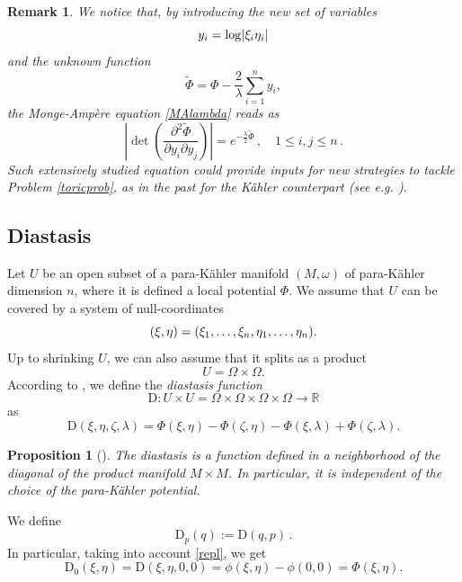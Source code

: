 \documentclass[11pt, reqno]{amsart}
\DeclarePairedDelimiter{\abs}{\lvert}{\rvert}
\newtheorem{prop}[theor]{Proposition}
\newtheorem{rem}[theor]{Remark}
\newcommand{\de}{\partial}
\newcommand{\dd}{\mathrm{D}}
\newcommand{\R}{\mathds{R}}
\newcommand{\K }{K\"{a}hler }
\newcommand{\pk }{para-K\"{a}hler }
\begin{document}
\begin{rem}
We notice that, by introducing the new set of variables
$$y_i=\log\abs{\xi_i\eta_i}$$
and the unknown function
$$\tilde \Phi=\Phi-\frac{2}{\lambda}\sum_{i=1}^n y_i,$$
 the  Monge-Ampère equation  \eqref{MAlambda} reads as 
\begin{equation*}
\left|\det\left( \frac{\de^2 \tilde\Phi}{\de y_i\de y_j}\right)\right|=
e^{-\frac{\lambda}{2}\tilde\Phi}\,,\quad 1\leq i,j\leq n\,.
\end{equation*}
Such  extensively studied equation could provide inputs for new strategies to tackle Problem \ref{toricprob}, as in the past for the \K counterpart (see e.g. \cite{bb}).
\end{rem}



\subsection{Diastasis}\label{sec.diastasis}


Let  $U$ be an open subset of a \pk manifold  $(M,\omega)$ of \pk dimension $n$,  where it is defined a local potential $\Phi$. We  assume that $U$ can be covered by a system of null-coordinates 
$$
(\xi,\eta)=(\xi_1,\mathellipsis,\xi_n,\eta_1,\mathellipsis,\eta_n).
$$
%
Up to shrinking $U$, we can also assume that it splits as a product 
$$U=\Omega\times \Omega.$$  
According to \cite{MSpK}, we define the \emph{diastasis function}
$$\dd:U\times U=\Omega\times\Omega\times\Omega\times\Omega\to\R$$
as
$$
\dd\left(\xi,\eta,\zeta,\lambda\right)=\Phi(\xi,\eta)-\Phi(\zeta,\eta)-\Phi(\xi,\lambda)+\Phi(\zeta,\lambda).
$$

\begin{prop}[\cite{MSpK}]
The diastasis is a function defined in a neighborhood of the diagonal of the product
manifold $M\times M$. In particular, it is independent of the choice of the \pk potential.
\end{prop}
We define
$$
\dd_p(q):=\dd(q,p)\,.
$$
In particular, taking into account \eqref{repl}, we get
\begin{equation}\label{diast}
\dd_0(\xi,\eta)=\dd(\xi,\eta,0,0)=  \phi(\xi,\eta)-\phi(0,0)=\Phi(\xi,\eta).
\end{equation}
\end{document}
